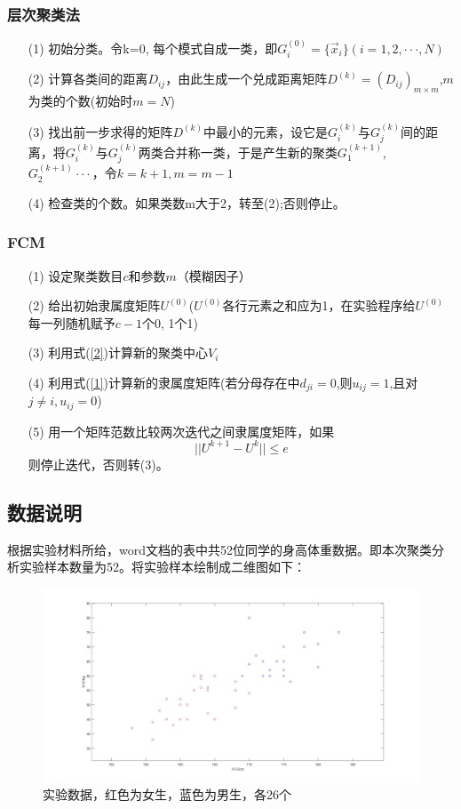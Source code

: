 \documentclass{article}
\begin{document}
\subsubsection{层次聚类法}
\begin{enumerate}
    \item[(1)] 初始分类。令k=0, 每个模式自成一类，即$G_i^{(0)} = \{ \Vec{x}_i \}(i = 1,2,···,N)$
    \item[(2)] 计算各类间的距离$D_{ij}$，由此生成一个兑成距离矩阵$D^{(k)} = (D_{ij})_{m \times m}$,$m$为类的个数(初始时$m=N$)
    \item[(3)] 找出前一步求得的矩阵$D^{(k)}$中最小的元素，设它是$G_i^{(k)}$与$G_j^{(k)}$间的距离，将$G_i^{(k)}$与$G_j^{(k)}$两类合并称一类，于是产生新的聚类$G_1^{(k+1)}$,\\$G_2^{(k+1)} ···$，令$k = k+1,m = m-1$
    \item[(4)] 检查类的个数。如果类数m大于2，转至(2);否则停止。
\end{enumerate}
\subsubsection{FCM}
\begin{enumerate}
    \item[(1)] 设定聚类数目$c$和参数$m$（模糊因子）
    \item[(2)] 给出初始隶属度矩阵$U^{(0)}$($U^{(0)}$各行元素之和应为1，在实验程序给$U^{(0)}$每一列随机赋予$c-1$个0, 1个1)
    \item[(3)]利用式(\ref{2})计算新的聚类中心$V_i$
    \item[(4)]利用式(\ref{1})计算新的隶属度矩阵(若分母存在中$d_{ji} = 0$,则$u_{ij} = 1$,且对$j \neq i,u_{ij} = 0$)
    \item[(5)]用一个矩阵范数比较两次迭代之间隶属度矩阵，如果
    \[
    ||U^{k+1}-U^{k}|| \leq e
    \]则停止迭代，否则转(3)。
\end{enumerate}
\subsection{数据说明}
根据实验材料所给，word文档的表中共52位同学的身高体重数据。即本次聚类分析实验样本数量为52。将实验样本绘制成二维图如下：
\begin{figure}[H]
    \centering
    \includegraphics[width=1\textwidth]{image/Figure01.jpg}
    \caption{实验数据，红色为女生，蓝色为男生，各26个}
    \label{Figure01.}
\end{figure}
\end{document}
